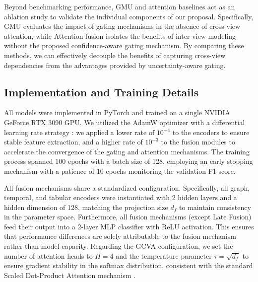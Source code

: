 \documentclass[journal]{IEEEtran}
\begin{document}
Beyond benchmarking performance, GMU and attention baselines act as an ablation study to validate the individual components of our proposal. Specifically, GMU evaluates the impact of gating mechanisms in the absence of cross-view attention, while Attention fusion isolates the benefits of inter-view modeling without the proposed confidence-aware gating mechanism. By comparing these methods, we can effectively decouple the benefits of capturing cross-view dependencies from the advantages provided by uncertainty-aware gating.

\subsection{Implementation and Training Details}

All models were implemented in PyTorch \cite{paszke2019pytorch} and trained on a single NVIDIA GeForce RTX 3090 GPU. We utilized the AdamW optimizer \cite{loshchilov2018decoupled} with a differential learning rate strategy \cite{howard2018universal}: we applied a lower rate of $10^{-4}$ to the encoders to ensure stable feature extraction, and a higher rate of $10^{-3}$ to the fusion modules to accelerate the convergence of the gating and attention mechanisms. The training process spanned 100 epochs with a batch size of 128, employing an early stopping mechanism with a patience of 10 epochs monitoring the validation F1-score. 

All fusion mechanisms share a standardized configuration. Specifically, all graph, temporal, and tabular encoders were instantiated with 2 hidden layers and a hidden dimension of 128, matching the projection size $d_f$ to maintain consistency in the parameter space. Furthermore, all fusion mechanisms (except Late Fusion) feed their output into a 2-layer MLP classifier with ReLU activation. This ensures that performance differences are solely attributable to the fusion mechanism rather than model capacity. Regarding the GCVA configuration, we set the number of attention heads to $H=4$ and the temperature parameter $\tau = \sqrt{d_f}$ to ensure gradient stability in the softmax distribution, consistent with the standard Scaled Dot-Product Attention mechanism \cite{vaswani2017attention}.
\end{document}
